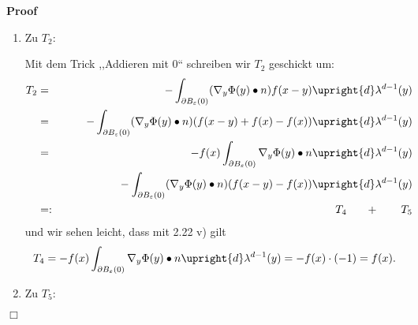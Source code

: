 \documentclass{book}
\newcommand{\backassign}{=:}
\newenvironment{enumeratealpha}{\begin{enumerate}[a{\textup{)}}] }{\end{enumerate}}
\newenvironment{proof}{\noindent\textbf{Proof\ }}{\hspace*{\fill}$\Box$\medskip}
\begin{document}
\begin{proof}
\begin{enumeratealpha}
    Mit $f \in C^2_0 (\Omega)$ ist $\nabla_y f (x - y) {\in C^1_0}  (\Omega,
    \mathbb{R}^d)$ also beschr{\"a}nkt, d.h.
    \[ \exists C \in \mathbb{R}_+ \forall x \in \Omega : \text{\quad} |
       \nabla_y f (x - y) | \leq C. \]
    {\hspace{1.7em}}Zudem ist $\Phi$ wegen Rotationssymmetrie auf $\partial
    B_{\varepsilon} (0)$ konstant, d.h. f{\"u}r ein $e \in \Omega$ mit $\| e
    \| = 1$ gilt
    \[ \int_{\partial B_{\varepsilon} (0)} | \Phi (y) |  \upright{d}
       \lambda^{d - 1} (y) = \int_{\partial B_{\varepsilon} (0)} | \Phi
       (\varepsilon e) | \upright{d} \lambda^{d - 1} (y) = | \Phi (\varepsilon
       e) | \omega_d \varepsilon^{d - 1} . \]
    {\hspace{1.7em}}Zusammen mit 2.22 iv) gilt daher
    \begin{eqnarray*}
      | T_3 | & = & \int_{\partial B_{\varepsilon} (0)} \Phi (y) \nabla_y f (x
      - y) \bullet n \upright{d} \lambda^{d - 1} (y)\\
      & \leq & C \int_{\partial B_{\varepsilon} (0)} | \Phi (y) | 
      \upright{d} \lambda^{d - 1} (y)\\
      & = & C | \Phi (\varepsilon e) | \omega_d \varepsilon^{d - 1}
      \xrightarrow{\varepsilon \rightarrow 0} 0.
    \end{eqnarray*}
    \item Zu $T_2$:
    
    Mit dem Trick ,,Addieren mit $0$`` schreiben wir $T_2$ geschickt um:
    \begin{eqnarray*}
      T_2 & = & - \int_{\partial B_{\varepsilon} (0)} (\nabla_y \Phi (y)
      \bullet n) f (x - y) \upright{d} \lambda^{d - 1} (y)\\
      & = & - \int_{\partial B_{\varepsilon} (0)} (\nabla_y \Phi (y) \bullet
      n)  (f (x - y) + f (x) - f (x)) \upright{d} \lambda^{d - 1} (y)\\
      & = & - f (x) \int_{\partial B_{\varepsilon} (0)} \nabla_y \Phi (y)
      \bullet n \upright{d} \lambda^{d - 1} (y)\\
      &  & \text{{\hspace{5em}}} - \int_{\partial B_{\varepsilon} (0)}
      (\nabla_y \Phi (y) \bullet n)  (f (x - y) - f (x)) \upright{d}
      \lambda^{d - 1} (y)\\
      & \backassign & \text{\qquad} T_4 \hspace{1.7em} + \text{\qquad} T_5
    \end{eqnarray*}
    und wir sehen leicht, dass mit 2.22 v) gilt
    \[ T_4 = - f (x) \int_{\partial B_{\varepsilon} (0)} \nabla_y \Phi (y)
       \bullet n \upright{d} \lambda^{d - 1} (y) = - f (x) \cdot (- 1) = f (x)
       . \]
    \item Zu $T_5$:
    

\end{enumeratealpha}
\end{proof}
\end{document}
